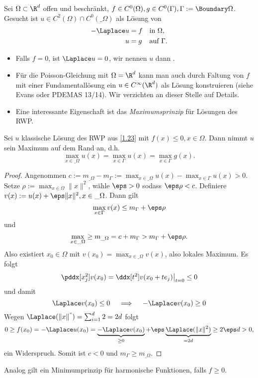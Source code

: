 \begin{df} \label{1.23}
	Sei $\Omega \subset \R^d$ offen und beschränkt, $f \in C^0(\Omega), g \in C^0(\Gamma), \Gamma := \Boundary \Omega$.
	Gesucht ist $u \in C^2(\Omega) \cap C^0(\_\Omega)$ als Lösung von
	\begin{align*}
		- \Laplace u &= f  && \text{in $\Omega$}, \\
		u &= g  && \text{auf $\Gamma$}.
	\end{align*}
	\begin{note}
		\begin{itemize}
			\item
				Falls $f = 0$, ist $\Laplace u = 0$, wir nennen $u$ dann .
			\item
				Für die Poisson-Gleichung mit $\Omega = \R^d$ kann man auch durch Faltung von $f$ mit einer Fundamentallösung ein $u \in C^\infty(\R^d)$ als Lösung konstruieren (siehe Evans oder PDEMAS 13/14).
				Wir verzichten an dieser Stelle auf Details.
			\item
				Eine interessante Eigenschaft ist das \emph{Maximumsprinzip} für Lösungen des RWP.
		\end{itemize}
	\end{note}
\end{df}

\begin{st} \label{1.24}
	Sei $u$ klassische Lösung des RWP aus \ref{1.23} mit $f(x) \le 0, x \in \Omega$.
	Dann nimmt $u$ sein Maximum auf dem Rand an, d.h.
	\[
		\max_{x\in \_\Omega} u(x) = \max_{x \in \Gamma} u(x) = \max_{x\in \Gamma} g(x).
	\]
	\begin{proof}
		Angenommen $c := m_{\_\Omega} - m_{\Gamma} := \max_{x\in \_\Omega} u(x) - \max_{x\in\Gamma} u(x) > 0$.
		Setze $\rho := \max_{x\in\Omega} \|x\|^2$, wähle $\eps > 0$ sodass $\eps \rho < c$.
		Definiere $v(x) := u(x) + \eps \|x\|^2, x \in \_\Omega$.
		Dann gilt
		\[
			\max_{x\in\Gamma} v(x) \le m_\Gamma + \eps \rho
		\]
		und
		\[
			\max_{x\in\_\Omega} \ge m_{\_\Omega} = c + m_\Gamma > m_\Gamma + \eps \rho.
		\]
		Also existiert $x_0 \in \Omega$ mit $v(x_0) = \max_{x\in \_\Omega} v(x)$, also lokales Maximum.
		Es folgt
		\[
			\pddx[x_j^2] v(x_0)
			= \ddx[t^2] v(x_0 + te_j) \big|_{t=0}
			\le 0
		\]
		und damit
		\[
			\Laplace v(x_0) \le 0
			\quad\implies\quad
			-\Laplace v(x_0) \ge 0
		\]
		Wegen $\Laplace(\|x\|^") = \sum_{i=1}^d 2 = 2d$ folgt
		\[
			0
			\ge f(x_0)
			= - \Laplace u(x_0)
			= \underbrace{- \Laplace v(x_0)}_{\ge 0} + \eps \underbrace{\Laplace (\|x\|^2)}_{=2d}
			\ge 2\eps d
			> 0,
		\]
		ein Widerspruch.
		Somit ist $c < 0$ und $m_\Gamma \ge m_{\_\Omega}$.
	\end{proof}
	\begin{note}
		Analog gilt ein Minimumprinzip für harmonische Funktionen, falls $f \ge 0$.
	\end{note}
\end{st}

